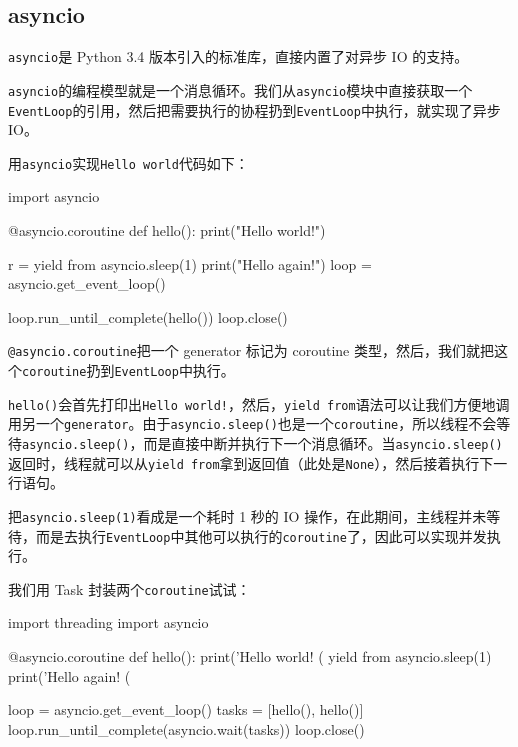 \hypertarget{asyncio}{%
\subsection{asyncio}\label{asyncio}}

\texttt{asyncio}是 Python 3.4 版本引入的标准库，直接内置了对异步 IO
的支持。

\texttt{asyncio}的编程模型就是一个消息循环。我们从\texttt{asyncio}模块中直接获取一个\texttt{EventLoop}的引用，然后把需要执行的协程扔到\texttt{EventLoop}中执行，就实现了异步
IO。

用\texttt{asyncio}实现\texttt{Hello\ world}代码如下：

\begin{pythoncode}
import asyncio

@asyncio.coroutine
def hello():
    print("Hello world!")
    
    r = yield from asyncio.sleep(1)
    print("Hello again!")
loop = asyncio.get_event_loop()

loop.run_until_complete(hello())
loop.close()
\end{pythoncode}

\texttt{@asyncio.coroutine}把一个 generator 标记为 coroutine
类型，然后，我们就把这个\texttt{coroutine}扔到\texttt{EventLoop}中执行。

\texttt{hello()}会首先打印出\texttt{Hello\ world!}，然后，\texttt{yield\ from}语法可以让我们方便地调用另一个\texttt{generator}。由于\texttt{asyncio.sleep()}也是一个\texttt{coroutine}，所以线程不会等待\texttt{asyncio.sleep()}，而是直接中断并执行下一个消息循环。当\texttt{asyncio.sleep()}返回时，线程就可以从\texttt{yield\ from}拿到返回值（此处是\texttt{None}），然后接着执行下一行语句。

把\texttt{asyncio.sleep(1)}看成是一个耗时 1 秒的 IO
操作，在此期间，主线程并未等待，而是去执行\texttt{EventLoop}中其他可以执行的\texttt{coroutine}了，因此可以实现并发执行。

我们用 Task 封装两个\texttt{coroutine}试试：

\begin{pythoncode}
import threading
import asyncio

@asyncio.coroutine
def hello():
    print('Hello world! (%
    yield from asyncio.sleep(1)
    print('Hello again! (%

loop = asyncio.get_event_loop()
tasks = [hello(), hello()]
loop.run_until_complete(asyncio.wait(tasks))
loop.close()
\end{pythoncode}

